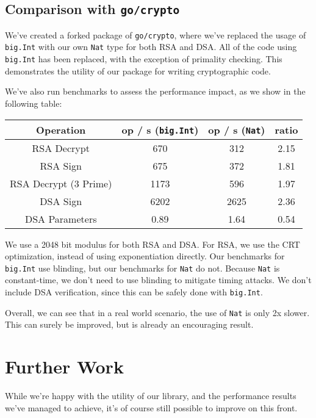 \documentclass[11pt, a4paper]{article} %
\begin{document}
{\subsection{Comparison with \texttt{go/crypto}}

We've created a forked package
\cite{meier_cronokirbyctcrypto_2021}
of \texttt{go/crypto}, where we've replaced the usage of \texttt{big.Int}
with our own \texttt{Nat} type for both RSA and DSA. All of the code
using \texttt{big.Int} has been replaced, with the exception of
primality checking. This demonstrates the utility of
our package for writing cryptographic code.

We've also run benchmarks to assess the performance impact, as we
show in the following table:

\begin{center}
 \begin{tabular}{|c | c | c | c|} 
 \hline
 Operation & op / s (\texttt{big.Int}) & op / s (\texttt{Nat}) & ratio \\ [0.5ex] 
 \hline\hline
 RSA Decrypt & 670 & 312 & 2.15 \\
 \hline
 RSA Sign & 675 & 372 & 1.81 \\
 \hline
 RSA Decrypt (3 Prime) & 1173 & 596 & 1.97 \\
 \hline
 DSA Sign & 6202 & 2625 & 2.36 \\
 \hline
 DSA Parameters & 0.89 & 1.64 & 0.54 \\
 \hline
\end{tabular}
\end{center}

We use a 2048 bit modulus for both RSA and DSA. For RSA, we use
the CRT optimization, instead of using exponentiation directly.
Our benchmarks for \texttt{big.Int} use blinding, but our benchmarks
for \texttt{Nat} do not. Because \texttt{Nat} is constant-time,
we don't need to use blinding to mitigate timing attacks.
We don't include DSA verification, since this can be safely done
with \texttt{big.Int}.

Overall, we can see that in a real world scenario, the use
of \texttt{Nat} is only 2x slower. This can surely be improved,
but is already an encouraging result.

\section{Further Work}

While we're happy with the utility of our library,
and the performance results we've managed to achieve, it's
of course still possible to improve on this front.

}
\end{document}
